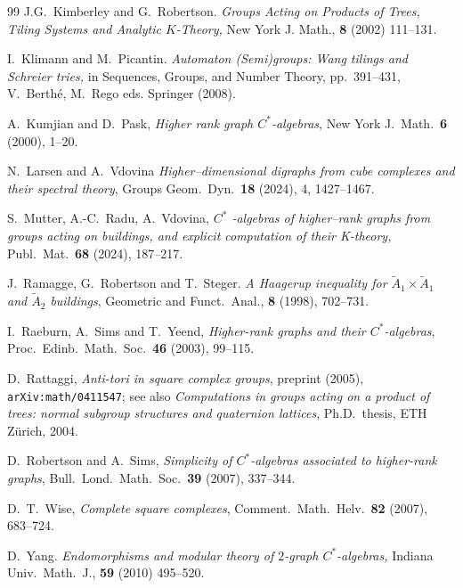 \documentclass[11pt,reqno]{amsart}
\theoremstyle{plain}
\theoremstyle{definition}
\begin{document}
\begin{thebibliography}{99}
 J.G.\ Kimberley and G.\ Robertson.
\emph{Groups Acting on Products of Trees, Tiling Systems and Analytic $K$-Theory,} New York J. Math., \textbf{8} (2002) 111--131.

 I.\ Klimann and M.\ Picantin. \emph{Automaton (Semi)groups: Wang tilings and Schreier tries,}  in Sequences, Groups, and Number Theory, pp.\ 391--431, V.\ Berth\'{e}, M.\ Rego eds.
Springer (2008).

A.~Kumjian and D.~Pask, \emph{Higher rank graph $C^*$-algebras},
New York J.\ Math.\ \textbf{6} (2000), 1--20.


 N.\ Larsen and A.\ Vdovina \emph{Higher--dimensional digraphs from cube complexes and their spectral theory}, Groups Geom.\ Dyn.\ \textbf{18} (2024), 4, 1427--1467.

 S.\ Mutter, A.-C.\ Radu, A.\ Vdovina, \emph{$C^*$ -algebras of higher--rank graphs from groups acting on buildings, and explicit computation of their K-theory,} Publ.\ Mat.\ \textbf{68} (2024),  187--217.

 J.\ Ramagge, G.\ Robertson and T.\ Steger. \emph{A Haagerup inequality for $\tilde{A}_1 \times \tilde{A}_1$ and $\tilde{A}_2$
buildings}, Geometric and Funct.\ Anal., \textbf{8} (1998), 702--731. 

I.~Raeburn, A.~Sims and T.~Yeend, \emph{Higher-rank graphs and their
$C^*$-algebras}, Proc.\ Edinb.\ Math.\ Soc.\ \textbf{46} (2003), 99--115.

D.~Rattaggi, \emph{Anti-tori in square complex groups}, preprint (2005),
\texttt{arXiv:math/0411547}; see also \emph{Computations in groups acting on a
product of trees: normal subgroup structures and quaternion lattices}, Ph.D.\
thesis, ETH Z\"urich, 2004.

D.~Robertson and A.~Sims, \emph{Simplicity of $C^*$-algebras associated to
higher-rank graphs}, Bull.\ Lond.\ Math.\ Soc.\ \textbf{39} (2007), 337--344.

D.~T.~Wise, \emph{Complete square complexes}, Comment.\ Math.\ Helv.\ \textbf{82}
(2007), 683--724.

  D.\ Yang. \emph{Endomorphisms and modular theory of $2$-graph $C^*$-algebras,} Indiana Univ.\ Math.\ J., \textbf{59} (2010) 495--520. 

\end{thebibliography}
\end{document}
